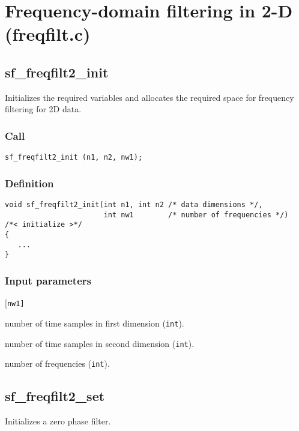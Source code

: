 \section{Frequency-domain filtering in 2-D (freqfilt.c)}




\subsection{{sf\_freqfilt2\_init}}\label{sec:sf_freqfilt2_init}
Initializes the required variables and allocates the required space for frequency filtering for 2D data.


\subsubsection*{Call}
\begin{verbatim}sf_freqfilt2_init (n1, n2, nw1);\end{verbatim}

\subsubsection*{Definition}
\begin{verbatim}
void sf_freqfilt2_init(int n1, int n2 /* data dimensions */, 
                       int nw1        /* number of frequencies */)
/*< initialize >*/
{
   ...
}
\end{verbatim}

\subsubsection*{Input parameters}
\begin{desclist}{\tt }{\quad}[\tt nw1]
   \setlength\itemsep{0pt}
   \item[n1]  number of time samples in first dimension (\texttt{int}).  
   \item[n2]  number of time samples in second dimension (\texttt{int}).  
   \item[nw1] number of frequencies (\texttt{int}).  
\end{desclist}




\subsection{{sf\_freqfilt2\_set}}
Initializes a zero phase filter.


